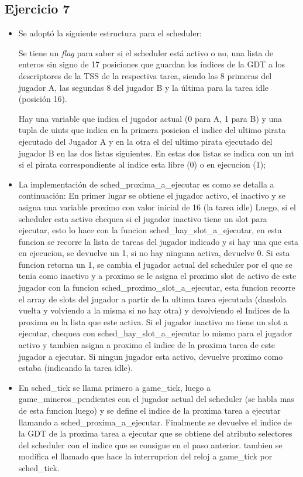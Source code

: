 \subsection{Ejercicio 7}

\begin{itemize}

\item Se adoptó la siguiente estructura para el scheduler:

Se tiene un {\it flag\/} para saber si el scheduler está activo o no, una lista
de enteros sin signo de 17 posiciones que guardan los índices de la GDT  a los
descriptores de la TSS de la respectiva tarea, siendo las 8 primeras del jugador
A, las segundas 8 del jugador B y la última para la tarea idle (posición 16).

Hay una variable que indica el jugador actual (0 para A, 1 para B) y una tupla
de uints que indica en la primera posicion el indice del ultimo pirata ejecutado del Jugador A y en la otra el del
ultimo pirata ejecutado del jugador B en las dos listas siguientes.
En estas dos listas se indica con un int si el pirata correspondiente al indice esta libre (0) o en ejecucion (1);

\item La implementación de sched_proxima_a_ejecutar es como se detalla a
continuación:
  En primer lugar se obtiene el jugador activo, el inactivo y se asigna una variable proximo con valor inicial de 16 (la tarea idle)
  Luego, si el scheduler esta activo chequea si el jugador inactivo tiene un slot para ejecutar, esto lo hace con la
  funcion sched_hay_slot_a_ejecutar, en esta funcion se recorre la lista de tareas del jugador indicado y si hay una que esta
  en ejecucion, se devuelve un 1, si no hay ninguna activa, devuelve 0.
  Si esta funcion retorna un 1, se cambia el jugador actual del scheduler por el que se tenia como inactivo y a proximo se le asigna
  el proximo slot de activo de este jugador con la funcion sched_proximo_slot_a_ejecutar, esta funcion recorre el array de slots
  del jugador a partir de la ultima tarea ejecutada (dandola vuelta y volviendo a la misma si no hay otra) y devolviendo el Indices
  de la proxima en la lista que este activa.
  Si el jugador inactivo no tiene un slot a ejecutar, chequea con sched_hay_slot_a_ejecutar lo mismo para el jugador activo y
  tambien asigna a proximo el indice de la proxima tarea de este jugador a ejecutar.
  Si ningun jugador esta activo, devuelve proximo como estaba (indicando la tarea idle).

\item En sched_tick se llama primero a game_tick, luego a game_mineros_pendientes con el jugador actual del scheduler (se habla mas
  de esta funcion luego) y se define el indice de la proxima tarea a ejecutar llamando a sched_proxima_a_ejecutar.
  Finalmente se devuelve el indice de la GDT de la proxima tarea a ejecutar que se obtiene del atributo selectores del scheduler
  con el indice que se consigue en el paso anterior. tambien se modifica el llamado que hace la interrupcion del reloj a game_tick
  por sched_tick.


\end{itemize}

